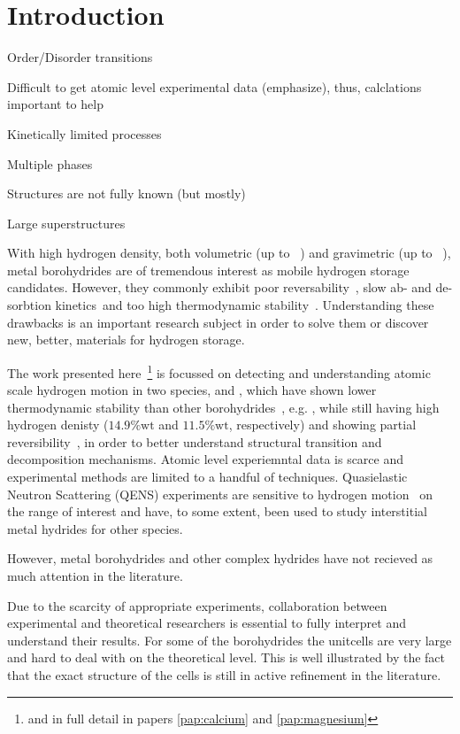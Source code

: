 \section{Introduction}
\label{sec:borohydrides-introduction}

\bit
\item Order/Disorder transitions
\item Difficult to get atomic level experimental data (emphasize), thus, calclations important to help
\item Kinetically limited processes
\item Multiple phases
\item Structures are not fully known (but mostly)
\item Large superstructures
\eit

With high hydrogen density, both volumetric (up to \missing{}~\citemiss) and gravimetric (up to \missing{}~\citemiss), metal borohydrides are of tremendous interest as mobile hydrogen storage candidates.
However, they commonly exhibit poor reversability~\citemiss, slow ab- and de-sorbtion kinetics~\citemiss and too high thermodynamic stability~\citemiss.
Understanding these drawbacks is an important research subject in order to solve them or discover new, better, materials for hydrogen storage.

The work presented here~\footnote{and in full detail in papers \ref{pap:calcium} and \ref{pap:magnesium}} is focussed on detecting and understanding atomic scale hydrogen motion in two species,  and , which have shown lower thermodynamic stability than other borohydrides~\cite{borohydride-stability-2006, calcium-stability-2006}, e.g. , while still having high hydrogen denisty ($14.9\%\text{wt}$ and $11.5\%\text{wt}$, respectively) and showing partial reversibility~\citemiss, in order to better understand structural transition and decomposition mechanisms.
Atomic level experiemntal data is scarce and experimental methods are limited to a handful of techniques.
Quasielastic Neutron Scattering (QENS) experiments are sensitive to hydrogen motion~\cite{qens-bee-1988} on the range of interest and have, to some extent, been used to study interstitial metal hydrides for other species.~\citemiss

However, metal borohydrides and other complex hydrides have not recieved as much attention in the literature.
\expand

Due to the scarcity of appropriate experiments, collaboration between experimental and theoretical researchers is essential to fully interpret and understand their results.
For some of the borohydrides the unitcells are very large and hard to deal with on the theoretical level.
This is well illustrated by the fact that the exact structure of the cells is still in active refinement in the literature.~\citemiss
\expand

